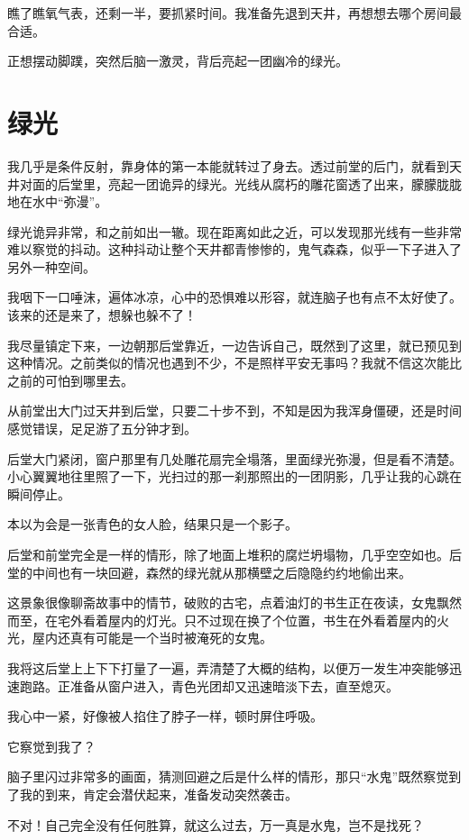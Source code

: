 瞧了瞧氧气表，还剩一半，要抓紧时间。我准备先退到天井，再想想去哪个房间最合适。

正想摆动脚蹼，突然后脑一激灵，背后亮起一团幽冷的绿光。

\chapter{绿光}

我几乎是条件反射，靠身体的第一本能就转过了身去。透过前堂的后门，就看到天井对面的后堂里，亮起一团诡异的绿光。光线从腐朽的雕花窗透了出来，朦朦胧胧地在水中“弥漫”。

绿光诡异非常，和之前如出一辙。现在距离如此之近，可以发现那光线有一些非常难以察觉的抖动。这种抖动让整个天井都青惨惨的，鬼气森森，似乎一下子进入了另外一种空间。

我咽下一口唾沫，遍体冰凉，心中的恐惧难以形容，就连脑子也有点不太好使了。该来的还是来了，想躲也躲不了！

我尽量镇定下来，一边朝那后堂靠近，一边告诉自己，既然到了这里，就已预见到这种情况。之前类似的情况也遇到不少，不是照样平安无事吗？我就不信这次能比之前的可怕到哪里去。

从前堂出大门过天井到后堂，只要二十步不到，不知是因为我浑身僵硬，还是时间感觉错误，足足游了五分钟才到。

后堂大门紧闭，窗户那里有几处雕花扇完全塌落，里面绿光弥漫，但是看不清楚。小心翼翼地往里照了一下，光扫过的那一刹那照出的一团阴影，几乎让我的心跳在瞬间停止。

本以为会是一张青色的女人脸，结果只是一个影子。

后堂和前堂完全是一样的情形，除了地面上堆积的腐烂坍塌物，几乎空空如也。后堂的中间也有一块回避，森然的绿光就从那横壁之后隐隐约约地偷出来。

这景象很像聊斋故事中的情节，破败的古宅，点着油灯的书生正在夜读，女鬼飘然而至，在宅外看着屋内的灯光。只不过现在换了个位置，书生在外看着屋内的火光，屋内还真有可能是一个当时被淹死的女鬼。

我将这后堂上上下下打量了一遍，弄清楚了大概的结构，以便万一发生冲突能够迅速跑路。正准备从窗户进入，青色光团却又迅速暗淡下去，直至熄灭。

我心中一紧，好像被人掐住了脖子一样，顿时屏住呼吸。

它察觉到我了？

脑子里闪过非常多的画面，猜测回避之后是什么样的情形，那只“水鬼”既然察觉到了我的到来，肯定会潜伏起来，准备发动突然袭击。

不对！自己完全没有任何胜算，就这么过去，万一真是水鬼，岂不是找死？

